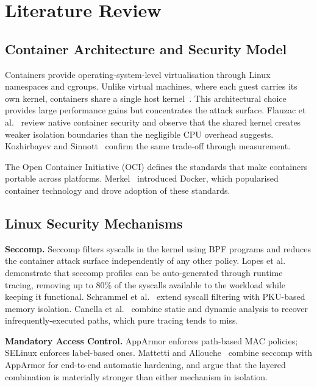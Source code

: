 
\chapter{Literature Review}\label{ch:litreview}

\section{Container Architecture and Security Model}

Containers provide operating-system-level virtualisation through Linux namespaces and cgroups. Unlike virtual machines, where each guest carries its own kernel, containers share a single host kernel~\cite{wang2023}. This architectural choice provides large performance gains but concentrates the attack surface. Flauzac et al.~\cite{flauzac2020} review native container security and observe that the shared kernel creates weaker isolation boundaries than the negligible CPU overhead suggests. Kozhirbayev and Sinnott~\cite{kozhirbayev2017} confirm the same trade-off through measurement.

The Open Container Initiative (OCI) defines the standards that make containers portable across platforms. Merkel~\cite{merkel2014} introduced Docker, which popularised container technology and drove adoption of these standards.

\section{Linux Security Mechanisms}

\textbf{Seccomp.} Seccomp filters syscalls in the kernel using BPF programs and reduces the container attack surface independently of any other policy. Lopes et al.~\cite{lopes2020} demonstrate that seccomp profiles can be auto-generated through runtime tracing, removing up to 80\% of the syscalls available to the workload while keeping it functional. Schrammel et al.~\cite{schrammel2022} extend syscall filtering with PKU-based memory isolation. Canella et al.~\cite{canella2021} combine static and dynamic analysis to recover infrequently-executed paths, which pure tracing tends to miss.

\textbf{Mandatory Access Control.} AppArmor enforces path-based MAC policies; SELinux enforces label-based ones. Mattetti and Allouche~\cite{mattetti2020} combine seccomp with AppArmor for end-to-end automatic hardening, and argue that the layered combination is materially stronger than either mechanism in isolation.

